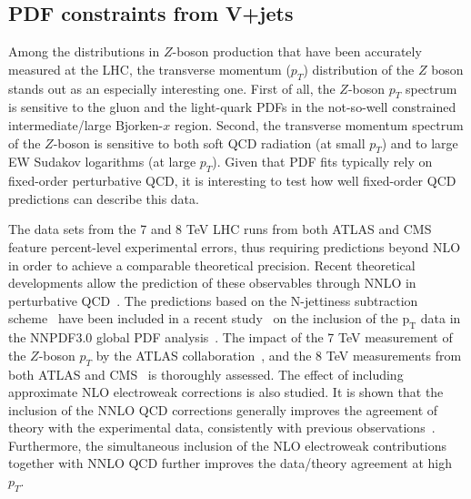 \documentclass[a4paper,11pt,notoc]{article}
\newcommand{\pt}{\ensuremath{\mathrm{p_T}}}
\begin{document}
\subsection{PDF constraints from V+jets}
Among the distributions in $Z$-boson production that have been accurately measured at the LHC, the transverse momentum ($p_T$) distribution of the $Z$ boson
stands out as an especially interesting one.
First of all, the $Z$-boson $p_T$ spectrum is sensitive to the gluon 
and the light-quark PDFs in the not-so-well constrained intermediate/large 
Bjorken-$x$ region.
Second, the transverse momentum spectrum of the $Z$-boson is sensitive to 
both soft QCD radiation (at small $p_T$) and to large EW  
Sudakov logarithms (at large $p_T$). Given that PDF fits typically rely 
on fixed-order perturbative QCD, it is interesting to test how well 
fixed-order QCD predictions can describe this data. 

The data sets from the 7 and 8 TeV LHC runs from both ATLAS and CMS 
feature percent-level experimental errors, thus requiring 
predictions beyond NLO in order to achieve a comparable theoretical precision.
Recent theoretical developments allow the prediction of these observables 
through NNLO in perturbative QCD~\cite{Boughezal:2015ded,Boughezal:2016isb,Ridder:2016nkl,Gehrmann-DeRidder:2016jns}. 
The predictions based on the N-jettiness subtraction scheme~\cite{Boughezal:2015ded,Boughezal:2016isb} have been included in a recent 
study~\cite{Boughezal:2017nla} on the inclusion of the $\pt$ data 
in the NNPDF3.0 global PDF analysis~\cite{Ball:2014uwa}.
The impact of the 7 TeV measurement of the $Z$-boson $p_T$ by the ATLAS 
collaboration~\cite{Aad:2014xaa}, and the 8 TeV measurements from both 
ATLAS and CMS~\cite{Aad:2015auj,Khachatryan:2015oaa} is thoroughly assessed.  
The effect of including approximate NLO electroweak corrections is also studied.
It is shown that the inclusion of the NNLO QCD corrections generally improves 
the agreement of theory with the experimental data, consistently with 
previous observations~\cite{Ridder:2016nkl,Gehrmann-DeRidder:2016jns}. 
Furthermore, the simultaneous inclusion of the NLO electroweak contributions 
together with NNLO QCD further improves the data/theory agreement at high $p_T$.
\end{document}
